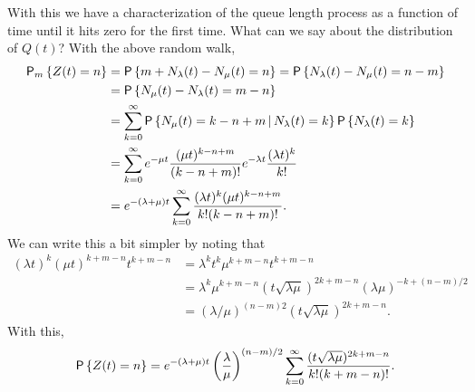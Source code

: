 \begin{exercise}
\begin{solution}
With this we have a characterization of the queue length process as a
function of time until it hits zero for the first time. What can we
say about the distribution of $Q(t)$? With the above random walk, 
\begin{equation}\label{eq:29}
  \begin{split}
    \P{Z(t)=n}_m
&= \P{m+N_\lambda(t) - N_\mu(t) = n }  = \P{N_\lambda(t) - N_\mu(t) = n-m }  \\
&= \P{N_\mu(t) - N_\lambda(t) = m-n }  \\
&= \sum_{k=0}^\infty \P{N_\mu(t) = k - n + m\given N_\lambda(t) = k } \P{N_\lambda(t)=k}\\
&= \sum_{k=0}^\infty e^{-\mu t} \frac{(\mu t)^{k -n+m}}{(k-n +m)!} e^{-\lambda t} \frac{(\lambda t)^k}{k!} \\
&= e^{-(\lambda+\mu)t} \sum_{k=0}^\infty \frac{(\lambda t)^k(\mu t)^{k  -n + m }}{k!(k-n+m)!}.
  \end{split}
\end{equation}
We can write this a bit simpler by noting that
\begin{equation*}
  \begin{split}
  (\lambda t)^k (\mu t) ^{k + m - n} t^{k+m-n} 
&=  \lambda^k t^k\mu^{k + m - n} t^{k+m-n} \\
&= \lambda^k \mu^{k + m - n} (t\sqrt{\lambda \mu})^{2k+m-n} (\lambda\mu)^{-k + (n-m)/2} \\
&= (\lambda/\mu)^{(n-m)2} (t\sqrt{\lambda \mu})^{2k+m-n}.
  \end{split}
\end{equation*}
With this,
\begin{equation*}
    \P{Z(t)=n} 
= e^{-(\lambda+\mu)t} \left(\frac\lambda\mu\right)^{(n-m)/2} \sum_{k=0}^\infty 
\frac{(t\sqrt{\lambda\mu} )^{2k+m-n}}{k!(k+m-n)!}.
\end{equation*}
  
\end{solution}
\end{exercise}


